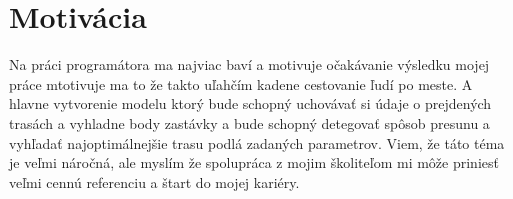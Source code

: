 \chapter{Motivácia}\label{chap:motivation}

Na práci programátora ma najviac baví a motivuje očakávanie výsledku mojej práce
mtotivuje ma to že takto uľahčím kadene cestovanie ľudí po meste. A hlavne vytvorenie
modelu ktorý bude schopný uchovávať si údaje o prejdených trasách a vyhladne body
zastávky a bude schopný detegovať spôsob presunu a vyhľadať najoptimálnejšie trasu podlá
zadaných parametrov. Viem, že táto téma je veľmi náročná, ale myslím že spolupráca
z mojim školiteľom mi môže priniesť veľmi cennú referenciu a štart do mojej kariéry.

